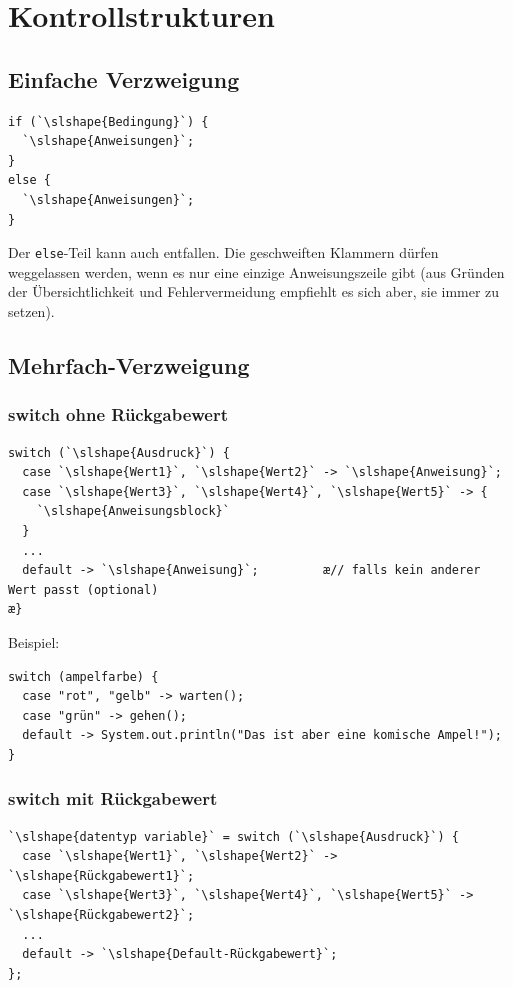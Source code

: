 \clearpage

\section{Kontrollstrukturen}

\subsection{Einfache Verzweigung}

\begin{lstlisting}
if (`\slshape{Bedingung}`) {
  `\slshape{Anweisungen}`;
}
else {
  `\slshape{Anweisungen}`;
}
\end{lstlisting}

Der \lstinline|else|-Teil kann auch entfallen. Die geschweiften Klammern dürfen
weggelassen werden, wenn es nur eine einzige Anweisungszeile gibt (aus Gründen
der Übersichtlichkeit und Fehlervermeidung empfiehlt es sich aber, sie immer zu
setzen).

\subsection{Mehrfach-Verzweigung}

\subsubsection{switch ohne Rückgabewert}

\begin{lstlisting}
switch (`\slshape{Ausdruck}`) {
  case `\slshape{Wert1}`, `\slshape{Wert2}` -> `\slshape{Anweisung}`;
  case `\slshape{Wert3}`, `\slshape{Wert4}`, `\slshape{Wert5}` -> {
    `\slshape{Anweisungsblock}`
  }
  ...
  default -> `\slshape{Anweisung}`;         æ// falls kein anderer Wert passt (optional)
æ}
\end{lstlisting}

Beispiel:

\begin{lstlisting}
switch (ampelfarbe) {
  case "rot", "gelb" -> warten();
  case "grün" -> gehen();
  default -> System.out.println("Das ist aber eine komische Ampel!");
}
\end{lstlisting}

\subsubsection{switch mit Rückgabewert}

\begin{lstlisting}
`\slshape{datentyp variable}` = switch (`\slshape{Ausdruck}`) {
  case `\slshape{Wert1}`, `\slshape{Wert2}` -> `\slshape{Rückgabewert1}`;
  case `\slshape{Wert3}`, `\slshape{Wert4}`, `\slshape{Wert5}` -> `\slshape{Rückgabewert2}`;
  ...
  default -> `\slshape{Default-Rückgabewert}`;
};
\end{lstlisting}

